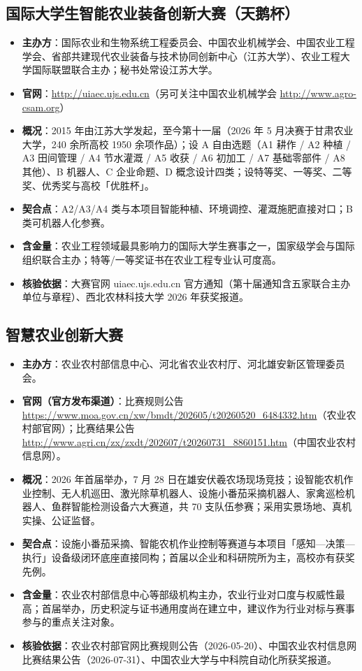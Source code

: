 \documentclass[11pt]{ctexart}
\begin{document}
\subsection{国际大学生智能农业装备创新大赛（天鹅杯）}
\begin{itemize}
  \item \textbf{主办方}：国际农业和生物系统工程委员会、中国农业机械学会、中国农业工程学会、省部共建现代农业装备与技术协同创新中心（江苏大学）、农业工程大学国际联盟联合主办；秘书处常设江苏大学。
  \item \textbf{官网}：\url{http://uiaec.ujs.edu.cn}（另可关注中国农业机械学会 \url{http://www.agro-csam.org}）
  \item \textbf{概况}：2015 年由江苏大学发起，至今第十一届（2026 年 5 月决赛于甘肃农业大学，240 余所高校 1950 余项作品）；设 A 自由选题（A1 耕作 / A2 种植 / A3 田间管理 / A4 节水灌溉 / A5 收获 / A6 初加工 / A7 基础零部件 / A8 其他）、B 机器人、C 企业命题、D 概念设计四类；设特等奖、一等奖、二等奖、优秀奖与高校「优胜杯」。
  \item \textbf{契合点}：A2/A3/A4 类与本项目智能种植、环境调控、灌溉施肥直接对口；B 类可机器人化参赛。
  \item \textbf{含金量}：农业工程领域最具影响力的国际大学生赛事之一，国家级学会与国际组织联合主办；特等/一等奖证书在农业工程专业认可度高。
  \item \textbf{核验依据}：大赛官网 uiaec.ujs.edu.cn 官方通知（第十届通知含五家联合主办单位与章程）、西北农林科技大学 2026 年获奖报道。
\end{itemize}

\subsection{智慧农业创新大赛}
\begin{itemize}
  \item \textbf{主办方}：农业农村部信息中心、河北省农业农村厅、河北雄安新区管理委员会。
  \item \textbf{官网（官方发布渠道）}：比赛规则公告 \url{https://www.moa.gov.cn/xw/bmdt/202605/t20260520_6484332.htm}（农业农村部官网）；比赛结果公告 \url{http://www.agri.cn/zx/zxdt/202607/t20260731_8860151.htm}（中国农业农村信息网）。
  \item \textbf{概况}：2026 年首届举办，7 月 28 日在雄安伏羲农场现场竞技；设智能农机作业控制、无人机巡田、激光除草机器人、设施小番茄采摘机器人、家禽巡检机器人、鱼群智能检测设备六大赛道，共 70 支队伍参赛；采用实景场地、真机实操、公证监督。
  \item \textbf{契合点}：设施小番茄采摘、智能农机作业控制等赛道与本项目「感知—决策—执行」设备级闭环底座直接同构；首届以企业和科研院所为主，高校亦有获奖先例。
  \item \textbf{含金量}：农业农村部信息中心等部级机构主办，农业行业对口度与权威性最高；首届举办，历史积淀与证书通用度尚在建立中，建议作为行业对标与赛事参与的重点关注对象。
  \item \textbf{核验依据}：农业农村部官网比赛规则公告（2026-05-20）、中国农业农村信息网比赛结果公告（2026-07-31）、中国农业大学与中科院自动化所获奖报道。
\end{itemize}
\end{document}
